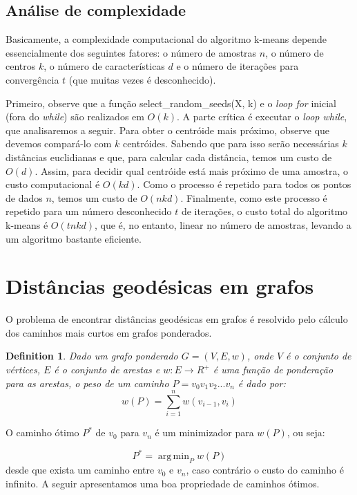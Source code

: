 \documentclass[sn-mathphys,Numbered]{sn-jnl}%
\theoremstyle{thmstyleone}%
\theoremstyle{thmstyletwo}%
\theoremstyle{thmstylethree}%
\newtheorem{definition}{Definition}%
\DeclareMathOperator*{\argmin}{arg\,min}
\begin{document}
\subsection{Análise de complexidade}

Basicamente, a complexidade computacional do algoritmo k-means depende essencialmente dos seguintes fatores: o número de amostras $n$, o número de centros $k$, o número de características $d$ e o número de iterações para convergência $t $ (que muitas vezes é desconhecido).

Primeiro, observe que a função select\_random\_seeds(X, k) e o \textit{loop for} inicial (fora do \textit{while}) são realizados em $O(k)$. A parte crítica é executar o \textit{loop while}, que analisaremos a seguir. Para obter o centróide mais próximo, observe que devemos compará-lo com $k$ centróides. Sabendo que para isso serão necessárias $k$ distâncias euclidianas e que, para calcular cada distância, temos um custo de $O(d)$. Assim, para decidir qual centróide está mais próximo de uma amostra, o custo computacional é $O(kd)$. Como o processo é repetido para todos os pontos de dados $n$, temos um custo de $O(nkd)$. Finalmente, como este processo é repetido para um número desconhecido $t$ de iterações, o custo total do algoritmo k-means é $O(tnkd)$, que é, no entanto, linear no número de amostras, levando a um algoritmo bastante eficiente.

\section{Distâncias geodésicas em grafos}

O problema de encontrar distâncias geodésicas em grafos é resolvido pelo cálculo dos caminhos mais curtos em grafos ponderados.

\vspace{0.5cm}
\begin{definition}
    Dado um grafo ponderado $G = (V, E, w)$, onde $V$ é o conjunto de vértices, $E$ é o conjunto de arestas e $w: E \rightarrow R^{+}$ é uma função de ponderação para as arestas, o peso de um caminho $P = v_0 v_1 v_2 ... v_n$ é dado por:
\begin{equation}
	w(P) = \sum_{i=1}^{n} w(v_{i-1}, v_i)
\end{equation}
\end{definition}

O caminho ótimo $P^{*}$ de $v_0$ para $v_n$ é um minimizador para $w(P)$, ou seja:

\begin{equation}
	P^{*} = \argmin_P w(P)
\end{equation} desde que exista um caminho entre $v_0$ e $v_n$, caso contrário o custo do caminho é infinito. A seguir apresentamos uma boa propriedade de caminhos ótimos.
\end{document}
